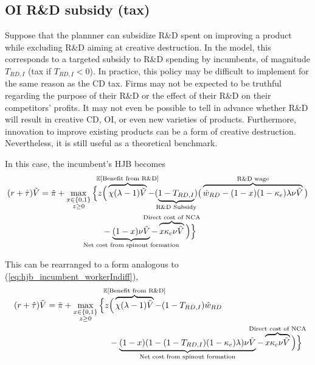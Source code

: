 \documentclass[11pt,english]{article}
\begin{document}
\subsection{OI R\&D subsidy (tax)}\label{cs:oi_rd_subsidy}

Suppose that the plannner can subsidize R\&D spent on improving a product while excluding R\&D aiming at creative destruction. In the model, this corresponds to a targeted subsidy to R\&D spending by incumbents, of magnitude $T_{RD,I}$ (tax if $T_{RD,I} < 0$). In practice, this policy may be difficult to implement for the same reason as the CD tax. Firms may not be expected to be truthful regarding the purpose of their R\&D or the effect of their R\&D on their competitors' profits. It may not even be possible to tell in advance whether R\&D will result in creative CD, OI, or even new varieties of products. Furthermore, innovation to improve existing products can be a form of creative destruction. Nevertheless, it is still useful as a theoretical benchmark.

In this case, the incumbent's HJB becomes
\begin{align}
(r + \hat{\tau}) \tilde{V} = \tilde{\pi} + \max_{\substack{x \in \{0,1\} \\ z \ge 0}} \Big\{z &\Big( \overbrace{\chi (\lambda - 1) \tilde{V}}^{\mathclap{\mathbb{E}[\textrm{Benefit from R\&D}]}}- (\underbrace{1-T_{RD,I}}_{\mathclap{\text{R\&D Subsidy}}}) \big( \overbrace{\hat{w}_{RD} - (1-x)(1-\kappa_e)\lambda \nu \tilde{V}}^{\mathclap{\text{R\&D wage}}}\big) \label{eq:hjb_incumbent_RDsubsidyTargeted} \nonumber \\ 
&-  \underbrace{(1-x) \nu \tilde{V}}_{\mathclap{\text{Net cost from spinout formation}}} - \overbrace{x \kappa_{c} \nu \tilde{V}}^{\mathclap{\text{Direct cost of NCA}}}\Big) \Big\} 
\end{align}

This can be rearranged to a form analogous to (\ref{eq:hjb_incumbent_workerIndiff}),
\begin{align}
(r + \hat{\tau}) \tilde{V} = \tilde{\pi} + \max_{\substack{x \in \{0,1\} \\ z \ge 0}} \Big\{z &\Big( \overbrace{\chi (\lambda - 1) \tilde{V}}^{\mathclap{\mathbb{E}[\textrm{Benefit from R\&D}]}}- (1-T_{RD,I}) \hat{w}_{RD} \\
&-  \underbrace{(1-x)(1 - (1-T_{RD,I})(1-\kappa_{e})\lambda)\nu \tilde{V}}_{\mathclap{\text{Net cost from spinout formation}}} - \overbrace{x \kappa_{c} \nu \tilde{V}}^{\mathclap{\text{Direct cost of NCA}}}\Big) \Big\} \label{eq:hjb_incumbent_RDsubsidyTargeted_2}
\end{align}
\end{document}
